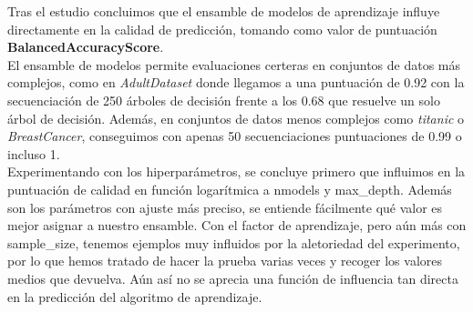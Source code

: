 \documentclass[conference,a4paper]{IEEEtran}
\begin{document}
Tras el estudio concluimos que el ensamble de modelos de aprendizaje influye directamente en la calidad de predicción, tomando como valor de puntuación \textbf{BalancedAccuracyScore}. \\

El ensamble de modelos permite evaluaciones certeras en conjuntos de datos más complejos, como en \textit{AdultDataset} donde llegamos a una puntuación de 0.92 con la secuenciación de 250 árboles de decisión frente a los 0.68 que resuelve un solo árbol de decisión. Además, en conjuntos de datos menos complejos como \textit{titanic} o \textit{BreastCancer}, conseguimos con apenas 50 secuenciaciones puntuaciones de 0.99 o incluso 1. \\

Experimentando con los hiperparámetros, se concluye primero que influimos en la puntuación de calidad en función logarítmica a nmodels y max\_depth. Además son los parámetros con ajuste más preciso, se entiende fácilmente qué valor es mejor asignar a nuestro ensamble. Con el factor de aprendizaje, pero aún más con sample\_size, tenemos ejemplos muy influidos por la aletoriedad del experimento, por lo que hemos tratado de hacer la prueba varias veces y recoger los valores medios que devuelva. Aún así no se aprecia una función de influencia tan directa en la predicción del algoritmo de aprendizaje. \\
\end{document}
